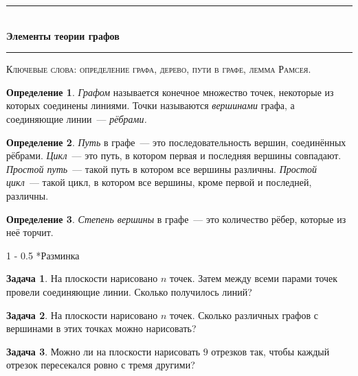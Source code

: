 \documentclass{article}
\makeatletter
\def \topic {Элементы теории графов}
\theoremstyle{definition}
\newtheorem{problem}{Задача}
\newtheorem*{definition}{Определение}
\renewcommand{\section}{\@startsection
{section}%
{1}%
{\z@}%
{-\baselineskip}%
{0.5\baselineskip}%
{\centering\large\scshape}} %
\makeatother
\begin{document}
\begin{center}

\newcommand{\HRule}{\rule{\linewidth}{0.5mm}}
\HRule \\[0.2cm]
{ \Large \bfseries \topic} %
\HRule

\end{center}

\textsc{Ключевые слова: определение графа, дерево, пути в графе, лемма Рамсея.}

\begin{definition}
	\textit{Графом} называется конечное множество точек, некоторые из которых 
	соединены линиями. Точки называются \textit{вершинами} графа, а соединяющие 
	линии~--- \textit{рёбрами.}
\end{definition}

\begin{definition}
	\textit{Путь} в графе~--- это последовательность вершин, 
	соединённых рёбрами. \textit{Цикл}~--- это путь, в котором первая и 
	последняя вершины совпадают. \textit{Простой путь}~--- такой путь в котором 
	все вершины различны. \textit{Простой цикл}~--- такой цикл, в котором все 
	вершины, кроме первой и последней, различны.
\end{definition}

\begin{definition}
	\textit{Степень вершины} в графе~--- это количество рёбер, которые из неё 
	торчит.
\end{definition}

\section*{Разминка}

\begin{problem}
	На плоскости нарисовано \( n \) точек. Затем между всеми парами точек 
	провели соединяющие линии. Сколько получилось линий?
\end{problem}

\begin{problem}
	На плоскости нарисовано \( n \) точек. Сколько различных графов с вершинами 
	в этих точках можно нарисовать?
\end{problem}

\begin{problem}
	Можно ли на плоскости нарисовать \( 9 \) отрезков так, чтобы каждый отрезок 
	пересекался ровно с тремя другими?
\end{problem}
\end{document}
